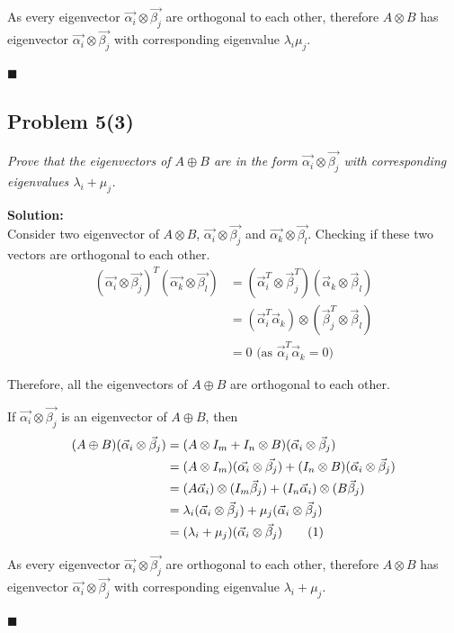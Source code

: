 \documentclass[12pt,a4paper]{article}
\newcommand\numberthis{\addtocounter{equation}{1}\tag{\theequation}}
\newcommand{\rightqed}{
\begin{flushright}
$\blacksquare$
\end{flushright}
}
\newcommand{\solution}{\noindent\textbf{Solution:}\\\indent}
\begin{document}
As every eigenvector $\vec{\alpha_i}\otimes \vec{\beta_j}$ are orthogonal to each other, therefore $A\otimes B$ has eigenvector $\vec{\alpha_i}\otimes \vec{\beta_j}$ with corresponding eigenvalue $\lambda_i\mu_j$.
\rightqed

\newpage
\subsection*{Problem 5(3)}
\textit{
    Prove that the eigenvectors of $A\oplus B$ are in the form $\vec{\alpha_i}\otimes \vec{\beta_j}$ with corresponding eigenvalues $\lambda_i+\mu_j$.
}

\solution
Consider two eigenvector of $A\otimes B$, $\vec{\alpha_i}\otimes \vec{\beta_j}$ and $\vec{\alpha_k}\otimes \vec{\beta_l}$. Checking if these two vectors are orthogonal to each other.
\begin{align*}
    (\vec{\alpha_i}\otimes \vec{\beta_j})^T(\vec{\alpha_k}\otimes \vec{\beta_l}) &= (\vec{\alpha}_i^T\otimes \vec{\beta}_j^T)(\vec{\alpha}_k\otimes \vec{\beta}_l) \\
    &= (\vec{\alpha}_i^T\vec{\alpha}_k)\otimes (\vec{\beta}_j^T\otimes \vec{\beta}_l) \\
    &= 0 \text{ (as $\vec{\alpha}_i^T\vec{\alpha}_k = 0$)}
\end{align*}

Therefore, all the eigenvectors of $A\oplus B$ are orthogonal to each other.

If $\vec{\alpha_i}\otimes \vec{\beta_j}$ is an eigenvector of $A\oplus B$, then
\begin{align*}
    (A\oplus B)(\vec{\alpha}_i\otimes \vec{\beta}_j) &= (A\otimes I_m + I_n\otimes B)(\vec{\alpha}_i\otimes \vec{\beta}_j) \\
    &= (A\otimes I_m)(\vec{\alpha_i}\otimes \vec{\beta_j}) + (I_n\otimes B)(\vec{\alpha}_i\otimes \vec{\beta}_j) \\
    &= (A\vec{\alpha}_i)\otimes(I_m\vec{\beta}_j) + (I_n\vec{\alpha}_i)\otimes(B\vec{\beta}_j) \\
    &= \lambda_i(\vec{\alpha}_i\otimes\vec{\beta}_j) + \mu_j(\vec{\alpha}_i\otimes\vec{\beta}_j) \\
    &= (\lambda_i + \mu_j)(\vec{\alpha}_i\otimes\vec{\beta}_j) \numberthis
\end{align*}

As every eigenvector $\vec{\alpha_i}\otimes \vec{\beta_j}$ are orthogonal to each other, therefore $A\otimes B$ has eigenvector $\vec{\alpha_i}\otimes \vec{\beta_j}$ with corresponding eigenvalue $\lambda_i+\mu_j$.
\rightqed
\end{document}
